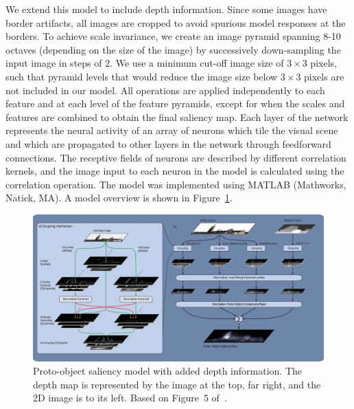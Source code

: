 We extend this model to include depth information. Since some images have border artifacts, all images are cropped to avoid spurious model responses at the borders. To achieve scale invariance, we create an image pyramid spanning 8-10 octaves (depending on the size of the image) by successively down-sampling the input image in steps of 2. We use a minimum cut-off image size of $3\times 3$ pixels, such that pyramid levels that would reduce the image size below $3\times 3$ pixels are not included in our model. All operations are applied independently to each feature and at each level of the feature pyramids, except for when the scales and features are combined to obtain the final saliency map. Each layer of the network represents the neural activity of an array of neurons which tile the visual scene and which are propagated to other layers in the network through feedforward connections. The receptive fields of neurons are described by different correlation kernels, and the image input to each neuron in the model is calculated using the correlation operation. The model was implemented using MATLAB (Mathworks, Natick, MA). A model overview is shown in Figure~\ref{Fig:Model}.

\begin{figure}[t]
\centering
\includegraphics[width=\textwidth]{3D-Saliency/figs/DepthSaliency_new1.eps}
\makeatletter
\let\@currsize\normalsize
\caption[Proto-object saliency model with added depth information]{Proto-object saliency model with added depth information. The depth map is represented by the image at the top, far right, and the 2D image is to its left. Based on Figure~5 of~\cite{Russell_etal14}.}
\label{Fig:Model}
\end{figure}

